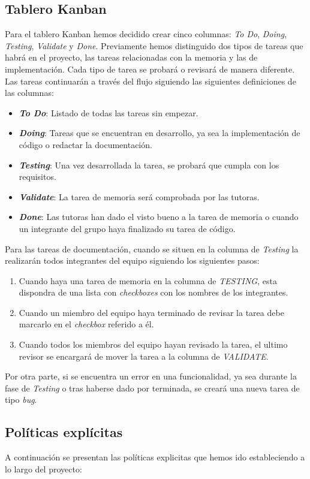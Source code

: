 \subsection{Tablero Kanban}
Para el tablero Kanban hemos decidido crear cinco columnas: \textit{To Do}, \textit{Doing}, \textit{Testing}, \textit{Validate} y \textit{Done}.
Previamente hemos distinguido dos tipos de tareas que habrá en el proyecto, las tareas relacionadas con la memoria y las de implementación. Cada tipo de tarea se probará o revisará de manera diferente. 
Las tareas continuarán a través del flujo siguiendo las siguientes definiciones de las columnas:
\begin{itemize}
    \item \textbf{\textit{To Do}}: Listado de todas las tareas sin empezar.
    \item \textbf{\textit{Doing}}: Tareas que se encuentran en desarrollo, ya sea la implementación de código o redactar la documentación.
    \item \textbf{\textit{Testing}}: Una vez desarrollada la tarea, se probará que cumpla con los requisitos.
    \item \textbf{\textit{Validate}}: La tarea de memoria será comprobada por las tutoras.
    \item \textbf{\textit{Done}}: Las tutoras han dado el visto bueno a la tarea de memoria o cuando un integrante del grupo haya finalizado su tarea de código.
\end{itemize}
Para las tareas de documentación, cuando se situen en la columna de \textit{Testing} la realizarán todos integrantes del equipo siguiendo los siguientes pasos:
\begin{enumerate}
    \item Cuando haya una tarea de memoria en la columna de \textit{TESTING}, esta dispondra de una lista con \textit{checkboxes} con los nombres de los integrantes.
    \item Cuando un miembro del equipo haya terminado de revisar la tarea debe marcarlo en el \textit{checkbox} referido a él.
    \item Cuando todos los miembros del equipo hayan revisado la tarea, el ultimo revisor se encargará de mover la tarea a la columna de \textit{VALIDATE}.
\end{enumerate}
Por otra parte, si se encuentra un error en una funcionalidad, ya sea durante la fase de \textit{Testing} o tras haberse dado por terminada, se creará una nueva tarea de tipo \textit{bug}.

\subsection{Políticas explícitas}
A continuación se presentan las políticas explicitas que hemos ido estableciendo a lo largo del proyecto:

